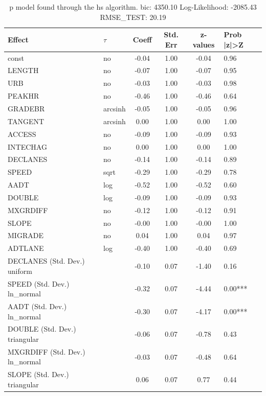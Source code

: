 \begin{table}
	\caption{p model found through the hs algorithm. bic: 4350.10 Log-Likelihood: -2085.43 RMSE_TEST: 20.19}
	\begin{center}
		\begin{tabular}{|l|l|c|c|c|l|}
			\hline
			Effect & $\tau$ & Coeff & Std. Err & z-values & Prob |z|>Z \\
			\hline
			const & no & -0.04 & 1.00 & -0.04 & 0.96 \\
			\hline
			LENGTH & no & -0.07 & 1.00 & -0.07 & 0.95 \\
			\hline
			URB & no & -0.03 & 1.00 & -0.03 & 0.98 \\
			\hline
			PEAKHR & no & -0.46 & 1.00 & -0.46 & 0.64 \\
			\hline
			GRADEBR & arcsinh & -0.05 & 1.00 & -0.05 & 0.96 \\
			\hline
			TANGENT & arcsinh & 0.00 & 1.00 & 0.00 & 1.00 \\
			\hline
			ACCESS & no & -0.09 & 1.00 & -0.09 & 0.93 \\
			\hline
			INTECHAG & no & 0.00 & 1.00 & 0.00 & 1.00 \\
			\hline
			DECLANES & no & -0.14 & 1.00 & -0.14 & 0.89 \\
			\hline
			SPEED & sqrt & -0.29 & 1.00 & -0.29 & 0.78 \\
			\hline
			AADT & log & -0.52 & 1.00 & -0.52 & 0.60 \\
			\hline
			DOUBLE & log & -0.09 & 1.00 & -0.09 & 0.93 \\
			\hline
			MXGRDIFF & no & -0.12 & 1.00 & -0.12 & 0.91 \\
			\hline
			SLOPE & no & -0.00 & 1.00 & -0.00 & 1.00 \\
			\hline
			MIGRADE & no & 0.04 & 1.00 & 0.04 & 0.97 \\
			\hline
			ADTLANE & log & -0.40 & 1.00 & -0.40 & 0.69 \\
			\hline
			DECLANES (Std. Dev.) uniform &  & -0.10 & 0.07 & -1.40 & 0.16 \\
			\hline
			SPEED (Std. Dev.) ln_normal &  & -0.32 & 0.07 & -4.44 & 0.00*** \\
			\hline
			AADT (Std. Dev.) ln_normal &  & -0.30 & 0.07 & -4.17 & 0.00*** \\
			\hline
			DOUBLE (Std. Dev.) triangular &  & -0.06 & 0.07 & -0.78 & 0.43 \\
			\hline
			MXGRDIFF (Std. Dev.) ln_normal &  & -0.03 & 0.07 & -0.48 & 0.64 \\
			\hline
			SLOPE (Std. Dev.) triangular &  & 0.06 & 0.07 & 0.77 & 0.44 \\

\end{tabular}
\end{center}
\end{table}
